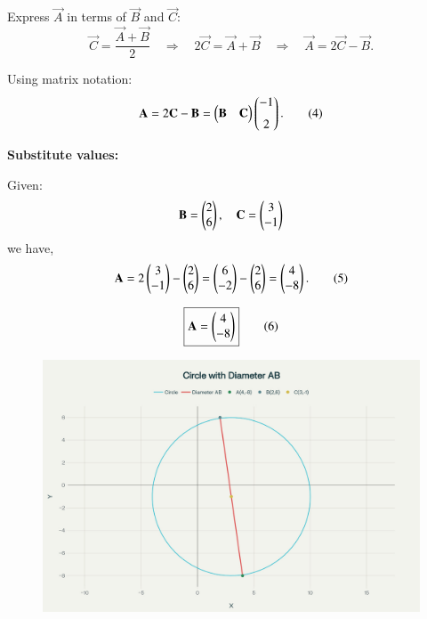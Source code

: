 \documentclass[journal]{IEEEtran}
\begin{document}
\bigskip

Express \(\vec{A}\) in terms of \(\vec{B}\) and \(\vec{C}\):
\begin{equation}
\vec{C} = \frac{\vec{A} + \vec{B}}{2}
\quad \Rightarrow \quad
2 \vec{C} = \vec{A} + \vec{B}
\quad \Rightarrow \quad
\vec{A} = 2 \vec{C} - \vec{B}.
\tag{3}
\end{equation}

Using matrix notation:
\begin{equation}
\mathbf{A} = 2 \mathbf{C} - \mathbf{B} 
= \begin{pmatrix} \mathbf{B} & \mathbf{C} \end{pmatrix}
\begin{pmatrix}-1 \\[6pt] 2\end{pmatrix}.
\tag{4}
\end{equation}

\bigskip

\textbf{Substitute values:}

Given:
\[
\mathbf{B} = \begin{pmatrix}2 \\ 6\end{pmatrix}, \quad \mathbf{C} = \begin{pmatrix}3 \\ -1\end{pmatrix}
\]
we have,
\begin{equation}
\mathbf{A} = 2 \begin{pmatrix}3 \\ -1\end{pmatrix} - \begin{pmatrix}2 \\ 6\end{pmatrix} 
= \begin{pmatrix}6 \\ -2\end{pmatrix} - \begin{pmatrix}2 \\ 6\end{pmatrix} 
= \begin{pmatrix}4 \\ -8\end{pmatrix}.
\tag{5}
\end{equation}

\bigskip

\begin{equation}
\boxed{\mathbf{A} = \begin{pmatrix}4 \\ -8\end{pmatrix}}
\tag{6}
\end{equation}




\begin{figure}[H]
    \centering
    \includegraphics[width=0.5\linewidth]{figs/fig.png}
    \caption{}
    \label{fig:placeholder}
\end{figure}
\end{document}
